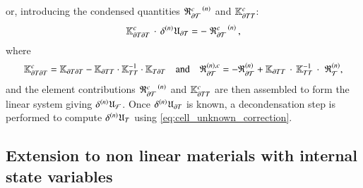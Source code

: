 %
%
%
or, introducing the condensed quantities
%
%
%
\(\iter{n}{\left.\mathfrak{R}^{c}_{\mathcal{\dCell}}\right.}\) and
\(\mathbb{K}_{\dCell\cell}^{c}\):
\[
\mathbb{K}_{\dCell\dCell}^{c}\,\cdot\,\iter{n}{\delta}\mathfrak{U}_{\dCell}=
-\iter{n}{\left.\mathfrak{R}^{c}_{\mathcal{\dCell}}\right.},
\]
%
%
%
where
%
%
%
\begin{equation}
  \begin{aligned}
    \mathbb{K}_{\dCell\dCell}^{c}
    =
    \mathbb{K}_{\dCell\dCell}
    -
    \mathbb{K}_{\dCell\cell} \cdot \mathbb{K}_{\cell\cell}^{-1} \cdot \mathbb{K}_{\cell\dCell}
    &&
    \text{and}
    &&
    \mathfrak{R}^{(n), c}_{\mathcal{\dCell}}
    =
    -\iter{n}{\mathfrak{R}}_{\mathcal{\dCell}}
    +\mathbb{K}_{\dCell\cell}\,\cdot\,\mathbb{K}_{\cell\cell}^{-1}\,\cdot\,\,\iter{n}{\mathfrak{R}}_{\mathcal{\cell}},
  \end{aligned}
\end{equation}
%
%
%
and the element contributions
\(\iter{n}{\left.\mathfrak{R}^{c}_{\mathcal{\dCell}}\right.}\) and
\(\mathbb{K}_{\dCell\cell}^{c}\) are then assembled to form the linear
system giving \(\iter{n}{\delta}\mathfrak{U}_{\mathcal{F}}\). Once
\(\iter{n}{\delta}\mathfrak{U}_{\dCell}\) is known, a decondensation
step is performed to compute \(\iter{n}{\delta}\mathfrak{U}_{\cell}\)
using \eqref{eq:cell_unknown_correction}.


\subsection{Extension to non linear materials with internal state variables}
\label{sec:discretization:extension_to_non_linear_materials}


